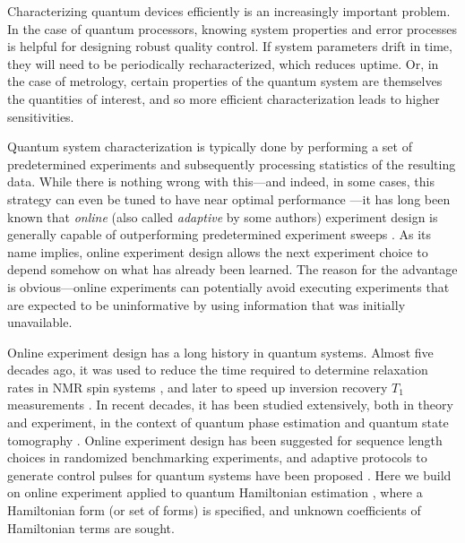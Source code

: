 \documentclass[aps,nofootinbib,twocolumn,superscriptaddress]{revtex4}
\begin{document}
Characterizing quantum devices efficiently is an increasingly
important problem.
In the case of quantum processors, knowing system properties
and error processes is helpful for designing robust quality control.
If system parameters drift in time, they will
need to be periodically recharacterized, which reduces uptime.
Or, in the case of metrology, certain properties of the quantum
system are themselves the quantities of interest, and so more efficient
characterization leads to higher sensitivities.

Quantum system characterization is typically done by performing
a set of predetermined experiments and subsequently processing
statistics of the resulting data.
While there is nothing wrong with this---and indeed, in some cases,
this strategy can even be tuned to have near optimal performance
\cite{chaloner_bayesian_1995,higgins_demonstrating_2009}---it
has long been known that \textit{online}
(also called \textit{adaptive} by some authors)
experiment design is generally
capable of outperforming predetermined experiment sweeps
\cite{chaloner_bayesian_1995}.
As its name implies, online experiment design allows the next experiment
choice to depend somehow on what has already been learned.
The reason for the advantage is obvious---online
experiments can potentially avoid executing experiments that
are expected to be uninformative by using information that was
initially unavailable.

Online experiment design has a long history in quantum systems.
Almost five decades ago, it was used to reduce the time required to
determine relaxation rates in NMR spin systems \cite{freeman_adaptive_1972},
and later to speed up inversion recovery $T_1$ measurements
\cite{taitelbaum_two-stage_1993}.
In recent decades, it has been studied extensively, both in theory
and experiment, in the context of quantum phase estimation
\cite{
    wiseman_adaptive_1995,
    berry_optimal_2001,
    higgins_entanglement-free_2007,
    berry_how_2009,
    higgins_demonstrating_2009,
    xiang_entanglement-enhanced_2011,
    yonezawa_quantum-enhanced_2012,
    ciampini_quantum-enhanced_2016}
and quantum state tomography
\cite{
    huszar_adaptive_2012,
    kravtsov_experimental_2013,
    ferrie_self-guided_2014,
    stenberg_adaptive_2015,
    struchalin_experimental_2016,
    granade_practical_2016,
    qi_adaptive_2017}.
Online experiment design has been suggested for sequence length choices in
randomized benchmarking experiments\cite{granade_accelerated_2015},
and adaptive protocols
to generate control pulses for quantum systems have been proposed
\cite{egger_adaptive_2014,ferrie_robust_2015,rol_restless_2017}.
Here we build on online experiment applied to
quantum Hamiltonian estimation
\cite{
    sergeevich_characterization_2011,
    granade_robust_2012,
    ferrie_how_2013,
    wiebe_hamiltonian_2014,
    stenberg_simultaneous_2016,
    stenberg_characterization_2016},
where a Hamiltonian form (or set of forms) is specified, and
unknown coefficients of Hamiltonian terms are sought.
\end{document}
